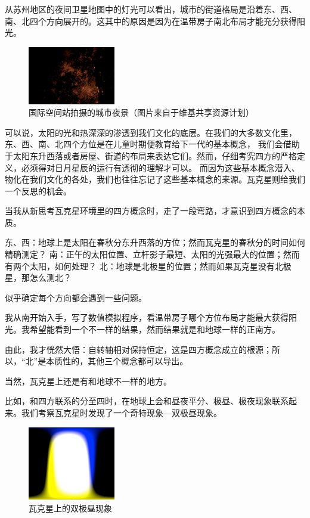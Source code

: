 \documentclass[a4paper,10.5pt]{book}
\begin{document}
从苏州地区的夜间卫星地图中的灯光可以看出，城市的街道格局是沿着东、西、南、北四个方向展开的。这其中的原因是因为在温带房子南北布局才能充分获得阳光。

\begin{figure}[ht]
\centering
\includegraphics[width=1.5in]{images/4_01-ISS-30_Nighttime_view_of_Shanghai.jpg}
\caption{国际空间站拍摄的城市夜景（图片来自于维基共享资源计划）}
\end{figure}

可以说，太阳的光和热深深的渗透到我们文化的底层。在我们的大多数文化里，东、西、南、北四个方位是在儿童时期便教育给下一代的基本概念，
我们会借助于太阳东升西落或者房屋、街道的布局来表达它们。然而，仔细考究四方的严格定义，必须得对日月星辰的运行有透彻的理解才可以。
而因为这些基本概念潜入、物化在我们文化的各处，我们也往往忘记了这些基本概念的来源。瓦克星则给我们一个反思的机会。

当我从新思考瓦克星环境里的四方概念时，走了一段弯路，才意识到四方概念的本质。

东、西：地球上是太阳在春秋分东升西落的方位；然而瓦克星的春秋分的时间如何精确测定？
南：正午的太阳位置、立杆影子最短、太阳的光强最大的位置；然而有两个太阳，如何处理？
北：地球是北极星的位置；然而如果瓦克星没有北极星，那怎么测北？

似乎确定每个方向都会遇到一些问题。

我从南开始入手，写了数值模拟程序，看温带房子哪个方位布局才能最大获得阳光。我希望能看到一个不一样的结果，然而结果就是和地球一样的正南方。

由此，我才恍然大悟：自转轴相对保持恒定，这是四方概念成立的根源；所以，“北”是本质性的，其他三个概念都可以导出。

当然，瓦克星上还是有和地球不一样的地方。

比如，和四方联系的分至四时，在地球上会和昼夜平分、极昼、极夜现象联系起来。我们考察瓦克星时发现了一个奇特现象—双极昼现象。

\begin{figure}[ht]
\centering
\includegraphics[width=1.5in]{images/4_02-day-night.png}
\caption{瓦克星上的双极昼现象}
\end{figure}
\end{document}
